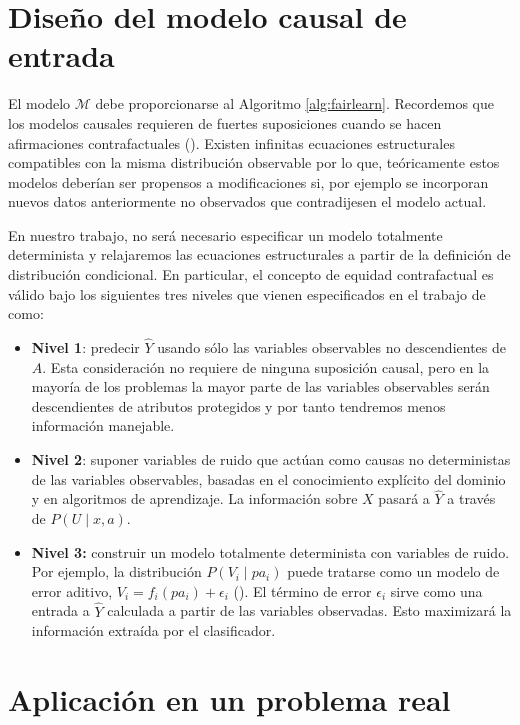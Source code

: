 \documentclass[oneside,openright,titlepage,numbers=noenddot,openany,headinclude,footinclude=true,
cleardoublepage=empty,abstractoff,BCOR=5mm,paper=a4,fontsize=12pt,main=spanish]{scrreprt}
\begin{document}
\section{Diseño del modelo causal de entrada}

\label{sec:modeloentrada}

El modelo $\mathcal{M}$ debe proporcionarse al Algoritmo \ref{alg:fairlearn}. Recordemos que los modelos causales requieren de fuertes suposiciones cuando se hacen afirmaciones contrafactuales (\cite{fairnesslearning2019}). Existen infinitas ecuaciones estructurales compatibles con la misma distribución observable por lo que, teóricamente estos modelos deberían ser propensos a modificaciones si, por ejemplo se incorporan nuevos datos anteriormente no observados que contradijesen el modelo actual.

En nuestro trabajo, no será necesario especificar un modelo totalmente determinista y relajaremos las ecuaciones estructurales a partir de la definición de distribución condicional. En particular, el concepto de equidad contrafactual es válido bajo los siguientes tres niveles que vienen especificados en el trabajo de \cite{counterfactual2018} como:

\begin{itemize}
    \item \textbf{Nivel 1}: predecir $\hat{Y}$ usando sólo las variables observables no descendientes de $A$. Esta consideración no requiere de ninguna suposición causal, pero en la mayoría de los problemas la mayor parte de las variables observables serán descendientes de atributos protegidos y por tanto tendremos menos información manejable.
    \item \textbf{Nivel 2}: suponer variables de ruido que actúan como causas no deterministas de las variables observables, basadas en el conocimiento explícito del dominio y en algoritmos de aprendizaje. La información sobre $X$ pasará a $\hat{Y}$ a través de $P(U \mid x, a)$.
    \item \textbf{Nivel 3:} construir un modelo totalmente determinista con variables de ruido. Por ejemplo, la distribución $P(V_i \mid pa_i)$ puede tratarse como un modelo de error aditivo, $V_i =f_i(pa_i)+\epsilon_i$ (\cite{noise2014}). El término de error $\epsilon_i$ sirve como una entrada a $\hat{Y}$ calculada a partir de las variables observadas. Esto maximizará la información extraída por el clasificador.
\end{itemize}

\section{Aplicación en un problema real}
\end{document}
